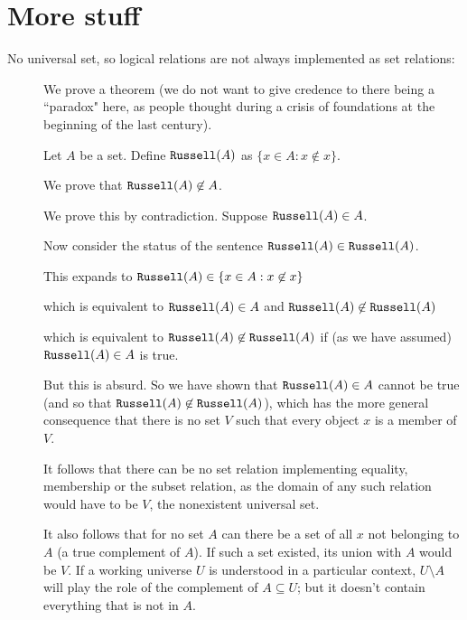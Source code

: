 \documentclass[12pt]{article}
\begin{document}
\newpage

\section{More stuff}

\begin{description}



\item[No universal set, so logical relations are not always implemented as set relations:]

We prove a theorem (we do not want to give credence to there being a ``paradox" here, as people thought during a crisis of foundations at the beginning of the last century).

Let $A$ be a set.  Define ${\tt Russell}(A)$ as $\{x \in A:x \not\in x\}$.

We prove that ${\tt Russell}(A)\not\in A$.

We prove this by contradiction.  Suppose ${\tt Russell}(A)\in A$.  

Now consider the status of the sentence ${\tt Russell}(A) \in {\tt Russell}(A)$.

This expands to ${\tt Russell}(A) \in \{x \in A:x \not\in x\}$

which is equivalent to ${\tt Russell}(A) \in A$ and ${\tt Russell}(A) \not\in {\tt Russell}(A)$

which is equivalent to ${\tt Russell}(A) \not\in {\tt Russell}(A)$ if (as we have assumed) ${\tt Russell}(A)\in A$ is true.

But this is absurd.  So we have shown that ${\tt Russell}(A)\in A$  cannot be true (and so that ${\tt Russell}(A) \not\in {\tt Russell}(A)$), which has the more general consequence
that there is no set $V$ such that every object $x$ is a member of $V$.

It follows that there can be no set relation implementing equality, membership or the subset relation, as the domain of any such relation would have to be $V$, the nonexistent universal set.

It also follows that for no set $A$ can there be a set of all $x$ not belonging to $A$ (a true complement of $A$).
If such a set existed, its union with $A$ would be $V$.  If a working universe $U$ is understood in a particular context,
$U \setminus A$ will play the role of the complement of $A \subseteq U$;  but it doesn't contain everything that is not in $A$.



\end{description}
\end{document}
